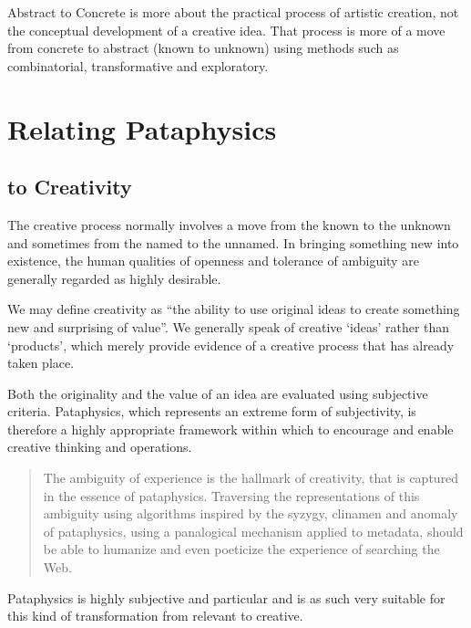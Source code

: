 \begin{draft}
  Abstract to Concrete is more about the practical process of artistic creation, not the conceptual development of a creative idea. That process is more of a move from concrete to abstract (known to unknown) using methods such as combinatorial, transformative and exploratory.
\end{draft}


\section{Relating Pataphysics}

\subsection{to Creativity}

\begin{leftbar}
The creative process normally involves a move from the known to the unknown and sometimes from the named to the unnamed. In bringing something new into existence, the human qualities of openness and tolerance of ambiguity are generally regarded as highly desirable.

We may define creativity as ``the ability to use original ideas to create something new and surprising of value''. We generally speak of creative `ideas' rather than `products', which merely provide evidence of a creative process that has already taken place.

Both the originality and the value of an idea are evaluated using subjective criteria. Pataphysics, which represents an extreme form of subjectivity, is therefore a highly appropriate framework within which to encourage and enable creative thinking and operations.
\end{leftbar}

\begin{quote}
  The ambiguity of experience is the hallmark of creativity, that is captured in the essence of pataphysics. Traversing the representations of this ambiguity using algorithms inspired by the syzygy, clinamen and anomaly of pataphysics, using a panalogical mechanism applied to metadata, should be able to humanize and even poeticize the experience of searching the Web. \autocite{Hendler2013}
\end{quote}

Pataphysics is highly subjective and particular and is as such very suitable for this kind of transformation from relevant to creative.

